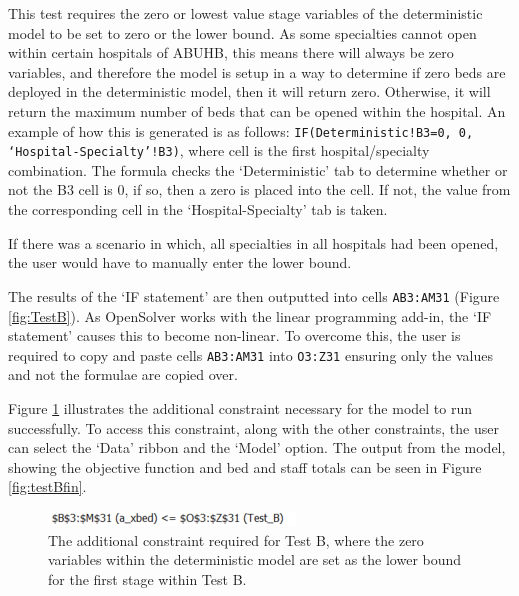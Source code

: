 \documentclass[../thesis.tex]{subfiles}
\begin{document}
This test requires the zero or lowest value stage variables of the deterministic model to be set to zero or the lower bound. As some specialties cannot open within certain hospitals of ABUHB, this means there will always be zero variables, and therefore the model is setup in a way to determine if zero beds are deployed in the deterministic model, then it will return zero. Otherwise, it will return the maximum number of beds that can be opened within the hospital.
An example of how this is generated is as follows: \texttt{IF(Deterministic!B3=0, 0, `Hospital-Specialty'!B3)}, where cell  is the first hospital/specialty combination. The formula checks the `Deterministic' tab to determine whether or not the B3 cell is 0, if so, then a zero is placed into the cell. If not, the value from the corresponding cell in the `Hospital-Specialty' tab is taken.

If there was a scenario in which, all specialties in all hospitals had been opened, the user would have to manually enter the lower bound.

The results of the `IF statement' are then outputted into cells \texttt{AB3:AM31} (Figure \ref{fig:TestB}). As OpenSolver works with the linear programming add-in, the `IF statement' causes this to become non-linear. To overcome this, the user is required to copy and paste cells \texttt{AB3:AM31} into \texttt{O3:Z31} ensuring only the values and not the formulae are copied over.

Figure \ref{fig:testbconstraint} illustrates the additional constraint necessary for the model to run successfully. To access this constraint, along with the other constraints, the user can select the `Data' ribbon and the `Model' option. The output from the model, showing the objective function and bed and staff totals can be seen in Figure \ref{fig:testBfin}.

\begin{figure}[h!]
    \centering
\includegraphics{Chapters/Chapter7/Figures/TestBconstraint.png}
    \caption{The additional constraint required for Test B, where the zero variables within the deterministic model are set as the lower bound for the first stage within Test B.}
    \label{fig:testbconstraint}
\end{figure}
\end{document}
